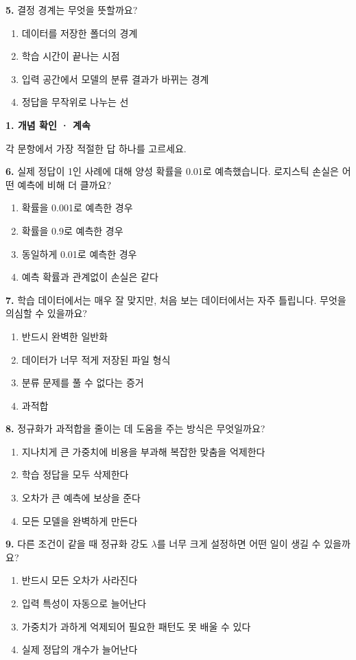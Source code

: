\documentclass[11pt,a4paper]{article}
\newcommand{\parttitle}[2]{{\large\bfseries\color{ink} #1}\par{\small #2}\par\vspace{5mm}}
\newcommand{\question}[2]{\textbf{#1.} #2\par}
\begin{document}
\question{5}{결정 경계는 무엇을 뜻할까요?}
\begin{enumerate}[label=(\arabic*),leftmargin=9mm,itemsep=0pt,topsep=2pt,parsep=0pt]
\item 데이터를 저장한 폴더의 경계
\item 학습 시간이 끝나는 시점
\item 입력 공간에서 모델의 분류 결과가 바뀌는 경계
\item 정답을 무작위로 나누는 선
\end{enumerate}\vfill
\newpage
\parttitle{1. 개념 확인 · 계속}{각 문항에서 가장 적절한 답 하나를 고르세요.}
\question{6}{실제 정답이 1인 사례에 대해 양성 확률을 0.01로 예측했습니다. 로지스틱 손실은 어떤 예측에 비해 더 클까요?}
\begin{enumerate}[label=(\arabic*),leftmargin=9mm,itemsep=0pt,topsep=2pt,parsep=0pt]
\item 확률을 0.001로 예측한 경우
\item 확률을 0.9로 예측한 경우
\item 동일하게 0.01로 예측한 경우
\item 예측 확률과 관계없이 손실은 같다
\end{enumerate}\vfill
\question{7}{학습 데이터에서는 매우 잘 맞지만, 처음 보는 데이터에서는 자주 틀립니다. 무엇을 의심할 수 있을까요?}
\begin{enumerate}[label=(\arabic*),leftmargin=9mm,itemsep=0pt,topsep=2pt,parsep=0pt]
\item 반드시 완벽한 일반화
\item 데이터가 너무 적게 저장된 파일 형식
\item 분류 문제를 풀 수 없다는 증거
\item 과적합
\end{enumerate}\vfill
\question{8}{정규화가 과적합을 줄이는 데 도움을 주는 방식은 무엇일까요?}
\begin{enumerate}[label=(\arabic*),leftmargin=9mm,itemsep=0pt,topsep=2pt,parsep=0pt]
\item 지나치게 큰 가중치에 비용을 부과해 복잡한 맞춤을 억제한다
\item 학습 정답을 모두 삭제한다
\item 오차가 큰 예측에 보상을 준다
\item 모든 모델을 완벽하게 만든다
\end{enumerate}\vfill
\question{9}{다른 조건이 같을 때 정규화 강도 $\lambda$를 너무 크게 설정하면 어떤 일이 생길 수 있을까요?}
\begin{enumerate}[label=(\arabic*),leftmargin=9mm,itemsep=0pt,topsep=2pt,parsep=0pt]
\item 반드시 모든 오차가 사라진다
\item 입력 특성이 자동으로 늘어난다
\item 가중치가 과하게 억제되어 필요한 패턴도 못 배울 수 있다
\item 실제 정답의 개수가 늘어난다
\end{enumerate}\vfill
\end{document}
